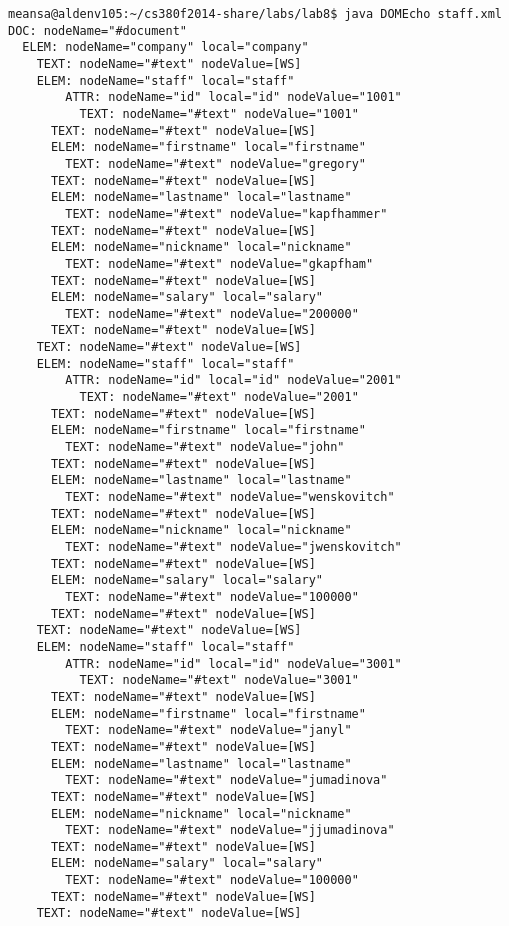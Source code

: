 \documentclass[11pt,english]{article}
\begin{document}
\begin{enumerate}
\begin{lstlisting}
meansa@aldenv105:~/cs380f2014-share/labs/lab8$ java DOMEcho staff.xml
DOC: nodeName="#document"
  ELEM: nodeName="company" local="company"
    TEXT: nodeName="#text" nodeValue=[WS]
    ELEM: nodeName="staff" local="staff"
        ATTR: nodeName="id" local="id" nodeValue="1001"
          TEXT: nodeName="#text" nodeValue="1001"
      TEXT: nodeName="#text" nodeValue=[WS]
      ELEM: nodeName="firstname" local="firstname"
        TEXT: nodeName="#text" nodeValue="gregory"
      TEXT: nodeName="#text" nodeValue=[WS]
      ELEM: nodeName="lastname" local="lastname"
        TEXT: nodeName="#text" nodeValue="kapfhammer"
      TEXT: nodeName="#text" nodeValue=[WS]
      ELEM: nodeName="nickname" local="nickname"
        TEXT: nodeName="#text" nodeValue="gkapfham"
      TEXT: nodeName="#text" nodeValue=[WS]
      ELEM: nodeName="salary" local="salary"
        TEXT: nodeName="#text" nodeValue="200000"
      TEXT: nodeName="#text" nodeValue=[WS]
    TEXT: nodeName="#text" nodeValue=[WS]
    ELEM: nodeName="staff" local="staff"
        ATTR: nodeName="id" local="id" nodeValue="2001"
          TEXT: nodeName="#text" nodeValue="2001"
      TEXT: nodeName="#text" nodeValue=[WS]
      ELEM: nodeName="firstname" local="firstname"
        TEXT: nodeName="#text" nodeValue="john"
      TEXT: nodeName="#text" nodeValue=[WS]
      ELEM: nodeName="lastname" local="lastname"
        TEXT: nodeName="#text" nodeValue="wenskovitch"
      TEXT: nodeName="#text" nodeValue=[WS]
      ELEM: nodeName="nickname" local="nickname"
        TEXT: nodeName="#text" nodeValue="jwenskovitch"
      TEXT: nodeName="#text" nodeValue=[WS]
      ELEM: nodeName="salary" local="salary"
        TEXT: nodeName="#text" nodeValue="100000"
      TEXT: nodeName="#text" nodeValue=[WS]
    TEXT: nodeName="#text" nodeValue=[WS]
    ELEM: nodeName="staff" local="staff"
        ATTR: nodeName="id" local="id" nodeValue="3001"
          TEXT: nodeName="#text" nodeValue="3001"
      TEXT: nodeName="#text" nodeValue=[WS]
      ELEM: nodeName="firstname" local="firstname"
        TEXT: nodeName="#text" nodeValue="janyl"
      TEXT: nodeName="#text" nodeValue=[WS]
      ELEM: nodeName="lastname" local="lastname"
        TEXT: nodeName="#text" nodeValue="jumadinova"
      TEXT: nodeName="#text" nodeValue=[WS]
      ELEM: nodeName="nickname" local="nickname"
        TEXT: nodeName="#text" nodeValue="jjumadinova"
      TEXT: nodeName="#text" nodeValue=[WS]
      ELEM: nodeName="salary" local="salary"
        TEXT: nodeName="#text" nodeValue="100000"
      TEXT: nodeName="#text" nodeValue=[WS]
    TEXT: nodeName="#text" nodeValue=[WS]




\end{lstlisting}
\end{enumerate}
\end{document}
